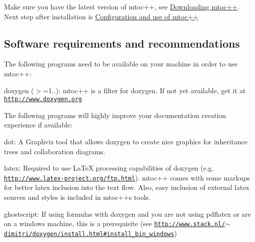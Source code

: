 Make sure you have the latest version of mtoc++, see \hyperlink{download}{Downloading mtoc++}. Next step after installation is \hyperlink{tools}{Configuration and use of mtoc++}\hypertarget{install_inst_req}{}\subsection{Software requirements and recommendations}\label{install_inst_req}
The following programs need to be available on your machine in order to use mtoc++\+:
\begin{DoxyItemize}
\item {\ttfamily doxygen} ($>$=1..)\+: mtoc++ is a filter for doxygen. If not yet available, get it at \href{http://www.doxygen.org}{\tt http\+://www.\+doxygen.\+org}
\end{DoxyItemize}

The following programs will highly improve your documentation creation experience if available\+:
\begin{DoxyItemize}
\item {\ttfamily dot\+:} A Graphviz tool that allows doxygen to create nice graphics for inheritance trees and collaboration diagrams.
\item {\ttfamily latex\+:} Required to use La\+Te\+X processing capabilities of doxygen (e.\+g. \href{http://www.latex-project.org/ftp.html}{\tt http\+://www.\+latex-\/project.\+org/ftp.\+html}). mtoc++ comes with some markups for better latex inclusion into the text flow. Also, easy inclusion of external latex sources and styles is included in mtoc++\textquotesingle{}s tools.
\item {\ttfamily ghostscript\+:} If using formulas with doxygen and you are not using pdflatex or are on a windows machine, this is a prerequisite (see \href{http://www.stack.nl/~dimitri/doxygen/install.html#install_bin_windows}{\tt http\+://www.\+stack.\+nl/$\sim$dimitri/doxygen/install.\+html\#install\+\_\+bin\+\_\+windows})
\end{DoxyItemize}

